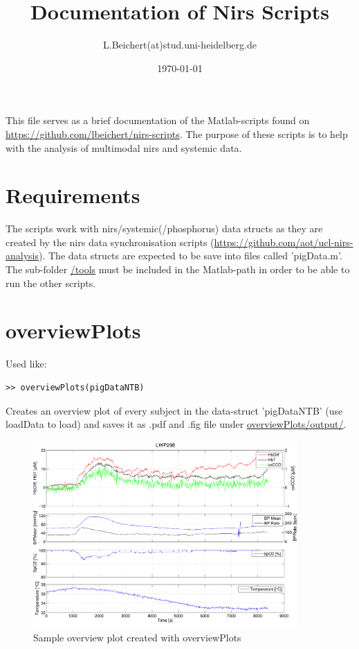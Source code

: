 \documentclass[10pt, a4paper]{article}
\title{Documentation of Nirs Scripts}
\author{L.Beichert(at)stud.uni-heidelberg.de}
\date{\today}
\begin{document}
\maketitle
\section*{}
This file serves as a brief documentation of the Matlab-scripts found on \url{https://github.com/lbeichert/nirs-scripts}. The purpose of these scripts is to help with the analysis of multimodal nirs and systemic data.
\section{Requirements}
The scripts work with nirs/systemic(/phosphorus) data structs as they are created by the nirs data synchronisation scripts (\url{https://github.com/aot/ucl-nirs-analysis}).
The data structs are expected to be save into files called 'pigData.m'.
The sub-folder \url{/tools} must be included in the Matlab-path in order to be able to run the other scripts.

\section{overviewPlots}
Used like:

\begin{lstlisting}
>> overviewPlots(pigDataNTB)
\end{lstlisting}

Creates an overview plot of every subject in the data-struct 'pigDataNTB' (use loadData to load) and saves it as .pdf and .fig file under \url{overviewPlots/output/}.

\begin{figure}[h]
\includegraphics[width=0.9\textwidth]{LWP298_Argon_Raw.pdf}
\caption{Sample overview plot created with overviewPlots}
\end{figure}
\end{document}
